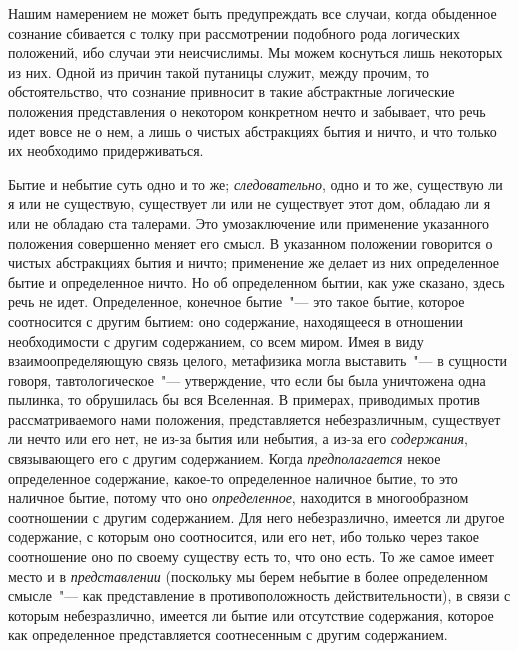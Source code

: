 Нашим намерением не может быть предупреждать все
случаи, когда обыденное сознание сбивается с толку при
рассмотрении подобного рода логических положений, ибо
случаи эти неисчислимы. Мы можем коснуться лишь некоторых
из них. Одной из причин такой путаницы служит,
между прочим, то обстоятельство, что сознание
привносит в такие абстрактные логические положения
представления о некотором конкретном нечто и забывает,
что речь идет вовсе не о нем, а лишь о чистых абстракциях
бытия и ничто, и что только их необходимо придерживаться.

Бытие и небытие суть одно и то же; \emph{следовательно},
одно и то же, существую ли я или не существую, существует
ли или не существует этот дом, обладаю ли я или
не обладаю ста талерами. Это умозаключение или применение
указанного положения совершенно меняет его
смысл. В указанном положении говорится о чистых абстракциях
бытия и ничто; применение же делает из них
определенное бытие и определенное ничто. Но об определенном
бытии, как уже сказано, здесь речь не идет.
Определенное, конечное бытие~"--- это такое бытие, которое
соотносится с другим бытием: оно содержание, находящееся
в отношении необходимости с другим содержанием,
со всем миром. Имея в виду взаимоопределяющую
связь целого, метафизика могла выставить~"--- в сущности
говоря, тавтологическое~"--- утверждение, что если бы была
уничтожена одна пылинка, то обрушилась бы вся Вселенная.
В примерах, приводимых против рассматриваемого
нами положения, представляется небезразличным,
существует ли нечто или его нет, не из-за бытия или
небытия, а из-за его \emph{содержания}, связывающего его
с другим содержанием. Когда \emph{предполагается} некое определенное
содержание, какое-то определенное наличное
бытие, то это наличное бытие, потому что оно \emph{определенное},
находится в многообразном соотношении с другим
содержанием. Для него небезразлично, имеется ли
другое содержание, с которым оно соотносится, или его
нет, ибо только через такое соотношение оно по своему
существу есть то, что оно есть. То же самое имеет место
и в \emph{представлении} (поскольку мы берем небытие в более
определенном смысле~"--- как представление в противоположность
действительности), в связи с которым небезразлично,
имеется ли бытие или отсутствие содержания,
которое как определенное представляется соотнесенным
с другим содержанием.

